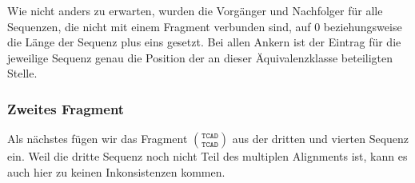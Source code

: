 Wie nicht anders zu erwarten, wurden die Vorgänger und Nachfolger für alle Sequenzen, die nicht mit einem Fragment verbunden sind, auf 0 beziehungsweise die Länge der Sequenz plus eins gesetzt. Bei allen Ankern ist der Eintrag für die jeweilige Sequenz genau die Position der an dieser Äquivalenzklasse beteiligten Stelle.

\subsubsection{Zweites Fragment}

Als nächstes fügen wir das Fragment ${\texttt{TCAD}}\choose{\texttt{TCAD}}$ aus der dritten und vierten Sequenz ein. Weil die dritte Sequenz noch nicht Teil des multiplen Alignments ist, kann es auch hier zu keinen Inkonsistenzen kommen.


